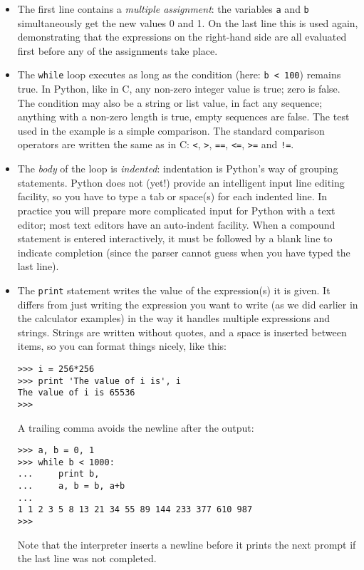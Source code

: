 \begin{itemize}

\item
The first line contains a {\em multiple assignment}: the variables
{\tt a} and {\tt b} simultaneously get the new values 0 and 1.  On the
last line this is used again, demonstrating that the expressions on
the right-hand side are all evaluated first before any of the
assignments take place.

\item
The {\tt while} loop executes as long as the condition (here: {\tt b <
100}) remains true.  In Python, like in C, any non-zero integer value is
true; zero is false.  The condition may also be a string or list value,
in fact any sequence; anything with a non-zero length is true, empty
sequences are false.  The test used in the example is a simple
comparison.  The standard comparison operators are written the same as
in C: {\tt <}, {\tt >}, {\tt ==}, {\tt <=}, {\tt >=} and {\tt !=}.

\item
The {\em body} of the loop is {\em indented}: indentation is Python's
way of grouping statements.  Python does not (yet!) provide an
intelligent input line editing facility, so you have to type a tab or
space(s) for each indented line.  In practice you will prepare more
complicated input for Python with a text editor; most text editors have
an auto-indent facility.  When a compound statement is entered
interactively, it must be followed by a blank line to indicate
completion (since the parser cannot guess when you have typed the last
line).

\item
The {\tt print} statement writes the value of the expression(s) it is
given.  It differs from just writing the expression you want to write
(as we did earlier in the calculator examples) in the way it handles
multiple expressions and strings.  Strings are written without quotes,
and a space is inserted between items, so you can format things nicely,
like this:

\bcode\begin{verbatim}
>>> i = 256*256
>>> print 'The value of i is', i
The value of i is 65536
>>> 
\end{verbatim}\ecode
%
A trailing comma avoids the newline after the output:

\bcode\begin{verbatim}
>>> a, b = 0, 1
>>> while b < 1000:
...     print b,
...     a, b = b, a+b
... 
1 1 2 3 5 8 13 21 34 55 89 144 233 377 610 987
>>> 
\end{verbatim}\ecode
%
Note that the interpreter inserts a newline before it prints the next
prompt if the last line was not completed.

\end{itemize}


